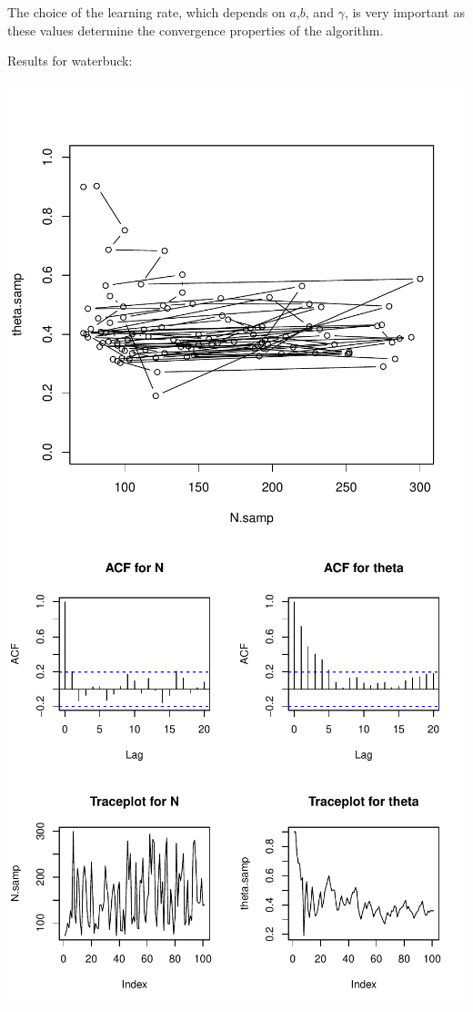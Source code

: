 \documentclass[letterpaper,12pt]{amsart}
\begin{document}
\begin{enumerate}[1.]
The choice of the learning rate, which depends on $a$,$b$, and $\gamma$, is very important as these values determine the convergence properties of the algorithm.

Results for waterbuck:
\begin{center}
\includegraphics[scale=0.5]{waterbuck-scatterplot.pdf}
\includegraphics[scale=0.5]{waterbuck-diagnostics.pdf}
\end{center}


\end{enumerate}
\end{document}
